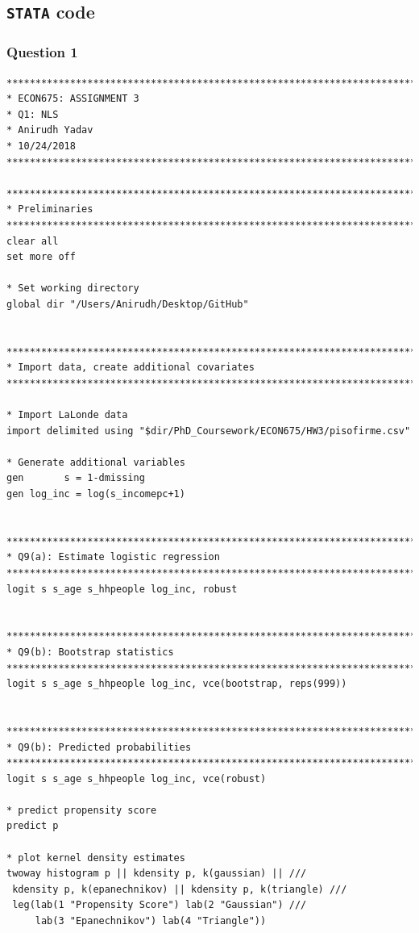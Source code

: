 \documentclass[12pt]{article}
\begin{document}
\newpage
\subsection{\texttt{STATA} code}

\subsubsection{Question 1}
\begin{verbatim}
********************************************************************************
* ECON675: ASSIGNMENT 3
* Q1: NLS
* Anirudh Yadav
* 10/24/2018
********************************************************************************

********************************************************************************
* Preliminaries
********************************************************************************
clear all
set more off

* Set working directory 
global dir "/Users/Anirudh/Desktop/GitHub"


********************************************************************************
* Import data, create additional covariates
********************************************************************************

* Import LaLonde data
import delimited using "$dir/PhD_Coursework/ECON675/HW3/pisofirme.csv"

* Generate additional variables
gen       s = 1-dmissing
gen log_inc = log(s_incomepc+1)


********************************************************************************
* Q9(a): Estimate logistic regression
********************************************************************************
logit s s_age s_hhpeople log_inc, robust


********************************************************************************
* Q9(b): Bootstrap statistics
********************************************************************************
logit s s_age s_hhpeople log_inc, vce(bootstrap, reps(999))


********************************************************************************
* Q9(b): Predicted probabilities
********************************************************************************
logit s s_age s_hhpeople log_inc, vce(robust)

* predict propensity score
predict p

* plot kernel density estimates
twoway histogram p || kdensity p, k(gaussian) || ///
 kdensity p, k(epanechnikov) || kdensity p, k(triangle) ///
 leg(lab(1 "Propensity Score") lab(2 "Gaussian") ///
	 lab(3 "Epanechnikov") lab(4 "Triangle"))

\end{verbatim}
\end{document}
